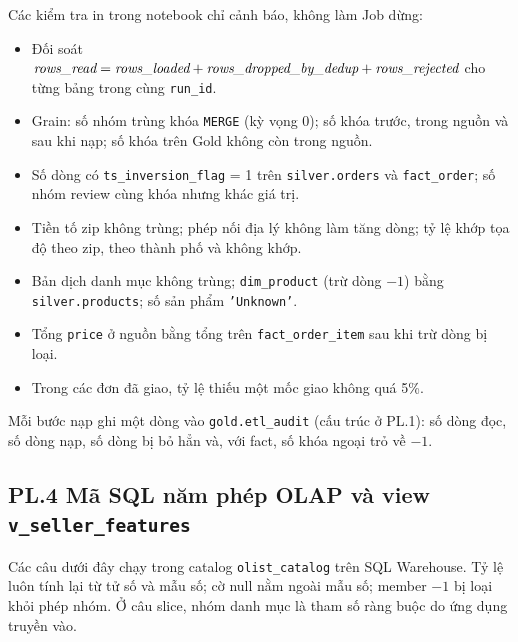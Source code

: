 \documentclass[a4paper]{article}
\begin{document}
Các kiểm tra in trong notebook chỉ cảnh báo, không làm Job dừng:
\begin{itemize}
  \item Đối soát $\textit{rows\_\allowbreak{}read} = \textit{rows\_\allowbreak{}loaded} + \textit{rows\_\allowbreak{}dropped\_\allowbreak{}by\_\allowbreak{}dedup} + \textit{rows\_\allowbreak{}rejected}$ cho từng bảng trong cùng \texttt{run\_\allowbreak{}id}.
  \item Grain: số nhóm trùng khóa \texttt{MERGE} (kỳ vọng 0); số khóa trước, trong nguồn và sau khi nạp; số khóa trên Gold không còn trong nguồn.
  \item Số dòng có \texttt{ts\_\allowbreak{}inversion\_\allowbreak{}flag} = 1 trên \texttt{silver.orders} và \texttt{fact\_\allowbreak{}order}; số nhóm review cùng khóa nhưng khác giá trị.
  \item Tiền tố zip không trùng; phép nối địa lý không làm tăng dòng; tỷ lệ khớp tọa độ theo zip, theo thành phố và không khớp.
  \item Bản dịch danh mục không trùng; \texttt{dim\_\allowbreak{}product} (trừ dòng $-1$) bằng \texttt{silver.products}; số sản phẩm \texttt{'Unknown'}.
  \item Tổng \texttt{price} ở nguồn bằng tổng trên \texttt{fact\_\allowbreak{}order\_\allowbreak{}item} sau khi trừ dòng bị loại.
  \item Trong các đơn đã giao, tỷ lệ thiếu một mốc giao không quá 5\%.
\end{itemize}
Mỗi bước nạp ghi một dòng vào \texttt{gold.etl\_\allowbreak{}audit} (cấu trúc ở PL.1): số dòng đọc, số dòng nạp, số dòng bị bỏ hẳn và, với fact, số khóa ngoại trỏ về $-1$.

\label{pl:4}
\subsection*{PL.4 Mã SQL năm phép OLAP và view \texttt{v\_\allowbreak{}seller\_\allowbreak{}features}}

Các câu dưới đây chạy trong catalog \texttt{olist\_\allowbreak{}catalog} trên SQL Warehouse. Tỷ lệ luôn tính lại từ tử số và mẫu số; cờ null nằm ngoài mẫu số; member $-1$ bị loại khỏi phép nhóm. Ở câu slice, nhóm danh mục là tham số ràng buộc do ứng dụng truyền vào.
\end{document}
